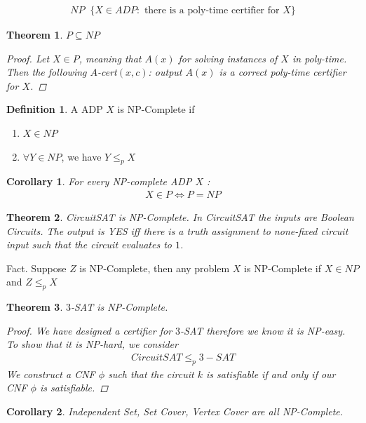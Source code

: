 \documentclass[a4paper]{article}
\theoremstyle{plain}
\newtheorem{thm}{Theorem}[section]
\newtheorem*{cor}{Corollary}
\newcommand*{\MyDef}{\mathrm{def}}
\newcommand*{\eqdef}{\ensuremath{\mathop{\overset{\MyDef}{=}}}}
\theoremstyle{definition}
\newtheorem{defn}{Definition}[section]
\theoremstyle{remark}
\begin{document}
	\begin{align*}
		NP \eqdef \{ X \in ADP : \text{ there is a poly-time certifier for }X\}
	\end{align*}
	\begin{thm}
		$P \subseteq NP$
	\begin{proof}
		Let $X \in P$, meaning that $A(x)$ for solving instances of $X$ in poly-time. Then the following $A$-cert$(x,c)$: output $A(x)$ is a correct poly-time certifier for $X$.
	\end{proof}
	\end{thm}
	\begin{defn}
		A ADP $X$ is NP-Complete if
		\begin{enumerate}
			\item $X \in NP$ 
			\item $\forall Y \in NP$, we have $Y \le_p X$
		\end{enumerate}
	\end{defn}
	\begin{cor}
		For every NP-complete ADP $X$ :
		\begin{align*}
			X \in P \iff P = NP
		\end{align*}
	\end{cor}
	\begin{thm}
		CircuitSAT is NP-Complete. In CircuitSAT the inputs are Boolean Circuits. The output is YES iff there is a truth assignment to none-fixed circuit input such that the circuit evaluates to $1$. 
	\end{thm}
	Fact. Suppose $Z$ is NP-Complete, then any problem $X$ is NP-Complete if $X \in NP$ and $Z \le_p X$
	\begin{thm}
		$3$-SAT is NP-Complete.
		\begin{proof}
			We have designed a certifier for $3$-SAT therefore we know it is NP-easy. To show that it is NP-hard, we consider
			\begin{align*}
				CircuitSAT \le_p 3-SAT
			\end{align*}
			We construct a CNF $\phi$ such that the circuit $k$ is satisfiable if and only if our CNF $\phi$ is satisfiable. 
		\end{proof}
	\end{thm}
	\begin{cor}
		Independent Set, Set Cover, Vertex Cover are all NP-Complete. 
	\end{cor}
\end{document}
